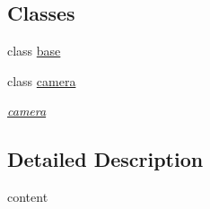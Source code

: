 \subsection*{Classes}
\begin{DoxyCompactItemize}
\item 
class \hyperlink{classnebula_1_1content_1_1base}{base}
\item 
class \hyperlink{classnebula_1_1content_1_1camera}{camera}
\begin{DoxyCompactList}\small\item\em \hyperlink{classnebula_1_1content_1_1camera}{camera} \item\end{DoxyCompactList}\end{DoxyCompactItemize}


\subsection{Detailed Description}
content 